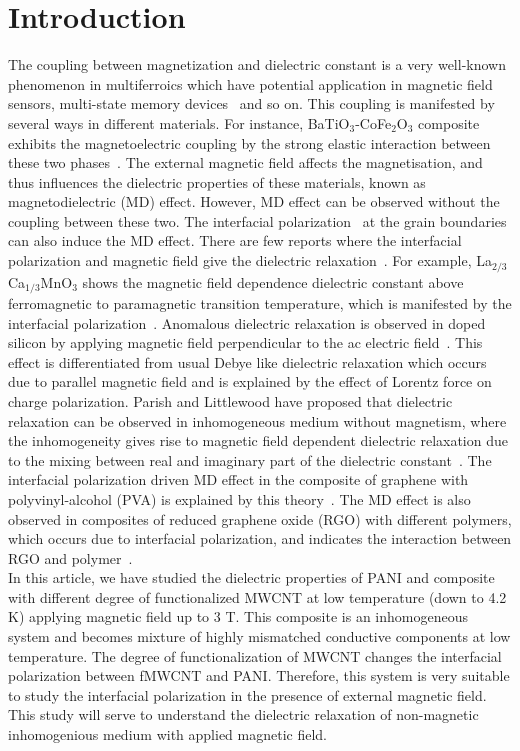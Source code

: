 \documentclass[journal=jaccck,manuscript=article]{achemso}
\begin{document}
\section{Introduction}
The coupling between magnetization and dielectric constant is a very well-known phenomenon in multiferroics which have potential application in magnetic field sensors, multi-state memory devices~\cite{appmodferro} and so on. This coupling is manifested by several ways in different materials. For instance, BaTiO$_3$-CoFe$_2$O$_3$ composite exhibits the magnetoelectric coupling by the strong elastic interaction between these two phases~\cite{Zheng661}. The external magnetic field affects the magnetisation, and thus influences the dielectric properties of these materials, known as magnetodielectric (MD) effect. However, MD effect can be observed without the coupling between these two. The interfacial polarization~\cite{Catalan} at the grain boundaries can also induce the MD effect. There are few reports where the interfacial polarization and magnetic field give the dielectric relaxation~\cite{Maglione_2008}. For example, La$_{2/3}$Ca$_{1/3}$MnO$_3$ shows the magnetic field dependence dielectric constant above ferromagnetic to paramagnetic transition temperature, which is manifested by the interfacial polarization~\cite{doi:10.1063/1.2213513}. Anomalous dielectric relaxation is observed in doped silicon by applying magnetic field perpendicular to the ac electric field~\cite{PhysRevB.78.045205Brook}. This effect is differentiated from usual Debye like dielectric relaxation which occurs due to parallel magnetic field and is explained by the effect of Lorentz force on charge polarization. Parish and Littlewood have proposed that dielectric relaxation can be observed in inhomogeneous medium without magnetism, where the inhomogeneity gives rise to magnetic field dependent dielectric relaxation due to the mixing between real and imaginary part of the dielectric constant~\cite{PhysRevLett.101.166602Parish}. The interfacial polarization driven MD effect in the composite of graphene with polyvinyl-alcohol (PVA) is explained by this theory~\cite{doi:10.1021/jp203724fMitra}. The MD effect is also observed in composites of reduced graphene oxide (RGO) with different polymers, which occurs due to interfacial polarization, and indicates the interaction between RGO and polymer~\cite{Pradhan_2020}. 
\\ In this article, we have studied the dielectric properties of PANI and composite with different degree of functionalized MWCNT at low temperature (down to 4.2 K) applying magnetic field up to 3 T. This composite is an inhomogeneous system and becomes mixture of highly mismatched conductive components at low temperature. The degree of functionalization of MWCNT changes the interfacial polarization between fMWCNT and PANI. Therefore, this system is very suitable to study the interfacial polarization in the presence of external magnetic field. This study will serve to understand the dielectric relaxation of non-magnetic inhomogenious medium with applied magnetic field.
\end{document}

